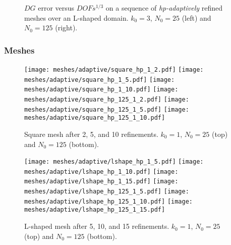 \begin{figure}[!ht]
    \begin{subfigure}[b]{0.45\textwidth}
		
	\end{subfigure}
	\hfill
	\begin{subfigure}[b]{0.45\textwidth}
		
	\end{subfigure}
    \caption{$DG$ error versus $DOFs^{1/3}$ on a sequence of \textit{hp-adaptively} refined meshes over an L-shaped domain. $k_0 = 3$, $N_0 = 25$ (left) and $N_0 = 125$ (right).}
\end{figure}

\newpage
\subsubsection{Meshes}

\begin{figure}[!ht]
	\centering
    \texttt{[image: meshes/adaptive/square\_hp\_1\_2.pdf]}
	\texttt{[image: meshes/adaptive/square\_hp\_1\_5.pdf]}
	\texttt{[image: meshes/adaptive/square\_hp\_1\_10.pdf]}
    \texttt{[image: meshes/adaptive/square\_hp\_125\_1\_2.pdf]}
	\texttt{[image: meshes/adaptive/square\_hp\_125\_1\_5.pdf]}
	\texttt{[image: meshes/adaptive/square\_hp\_125\_1\_10.pdf]}
    \caption{Square mesh after 2, 5, and 10 refinements. $k_0 = 1$, $N_0 = 25$ (top) and $N_0 = 125$ (bottom).}
\end{figure}

\begin{figure}[!ht]
	\centering
	\texttt{[image: meshes/adaptive/lshape\_hp\_1\_5.pdf]}
	\texttt{[image: meshes/adaptive/lshape\_hp\_1\_10.pdf]}
	\texttt{[image: meshes/adaptive/lshape\_hp\_1\_15.pdf]}
    \texttt{[image: meshes/adaptive/lshape\_hp\_125\_1\_5.pdf]}
	\texttt{[image: meshes/adaptive/lshape\_hp\_125\_1\_10.pdf]}
	\texttt{[image: meshes/adaptive/lshape\_hp\_125\_1\_15.pdf]}
    \caption{L-shaped mesh after 5, 10, and 15 refinements. $k_0 = 1$, $N_0 = 25$ (top) and $N_0 = 125$ (bottom).}
\end{figure}

